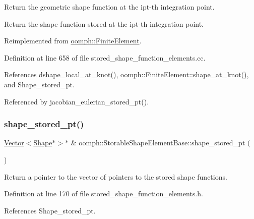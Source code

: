 Return the geometric shape function at the ipt-\/th integration point. 

Return the shape function stored at the ipt-\/th integration point. 

Reimplemented from \hyperlink{classoomph_1_1FiniteElement_aeccc0f774e3fab8c536e2d41004a1665}{oomph\+::\+Finite\+Element}.



Definition at line 658 of file stored\+\_\+shape\+\_\+function\+\_\+elements.\+cc.



References dshape\+\_\+local\+\_\+at\+\_\+knot(), oomph\+::\+Finite\+Element\+::shape\+\_\+at\+\_\+knot(), and Shape\+\_\+stored\+\_\+pt.



Referenced by jacobian\+\_\+eulerian\+\_\+stored\+\_\+pt().

\mbox{\label{classoomph_1_1StorableShapeElementBase_a5566712150a548f9a9390c56e21d96c7}} 
\subsubsection{\texorpdfstring{shape\+\_\+stored\+\_\+pt()}{shape\_stored\_pt()}\hspace{0.1cm}{\footnotesize\ttfamily [1/4]}}
{\footnotesize\ttfamily \hyperlink{classoomph_1_1Vector}{Vector}$<$\hyperlink{classoomph_1_1Shape}{Shape}$\ast$$>$$\ast$ \& oomph\+::\+Storable\+Shape\+Element\+Base\+::shape\+\_\+stored\+\_\+pt (\begin{DoxyParamCaption}{ }\end{DoxyParamCaption})\hspace{0.3cm}{\ttfamily [inline]}}



Return a pointer to the vector of pointers to the stored shape functions. 



Definition at line 170 of file stored\+\_\+shape\+\_\+function\+\_\+elements.\+h.



References Shape\+\_\+stored\+\_\+pt.



